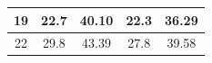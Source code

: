 \documentclass{article}
\begin{document}
\begin{Large}
\begin{table}[h]
\begin{tabular}{|c|cc|cc|}
19                                                                       & \multicolumn{1}{c|}{22.7}                                                    & 40.10                                                       & \multicolumn{1}{c|}{22.3}                                                    & 36.29                                                       \\ \hline
22                                                                       & \multicolumn{1}{c|}{29.8}                                                    & 43.39                                                       & \multicolumn{1}{c|}{27.8}                                                    & 39.58                                                       \\ \hline
\end{tabular}
\end{table}



\end{Large}
\end{document}
